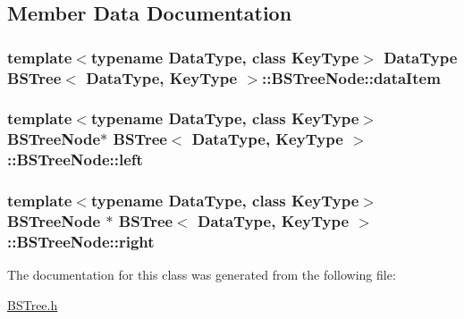 \subsection{Member Data Documentation}
\hypertarget{class_b_s_tree_1_1_b_s_tree_node_a507c8d6dde1b8d35d9af6b4e78f38962}{
\subsubsection[{data\-Item}]{\setlength{\rightskip}{0pt plus 5cm}template$<$typename Data\-Type, class Key\-Type$>$ Data\-Type {\bf B\-S\-Tree}$<$ Data\-Type, Key\-Type $>$\-::B\-S\-Tree\-Node\-::data\-Item}}\label{class_b_s_tree_1_1_b_s_tree_node_a507c8d6dde1b8d35d9af6b4e78f38962}
\hypertarget{class_b_s_tree_1_1_b_s_tree_node_a7a90150dd249432e240dc363955c5ca1}{
\subsubsection[{left}]{\setlength{\rightskip}{0pt plus 5cm}template$<$typename Data\-Type, class Key\-Type$>$ {\bf B\-S\-Tree\-Node}$\ast$ {\bf B\-S\-Tree}$<$ Data\-Type, Key\-Type $>$\-::B\-S\-Tree\-Node\-::left}}\label{class_b_s_tree_1_1_b_s_tree_node_a7a90150dd249432e240dc363955c5ca1}
\hypertarget{class_b_s_tree_1_1_b_s_tree_node_a8d7bfd0208a562c8b8ab332e1d796563}{
\subsubsection[{right}]{\setlength{\rightskip}{0pt plus 5cm}template$<$typename Data\-Type, class Key\-Type$>$ {\bf B\-S\-Tree\-Node} $\ast$ {\bf B\-S\-Tree}$<$ Data\-Type, Key\-Type $>$\-::B\-S\-Tree\-Node\-::right}}\label{class_b_s_tree_1_1_b_s_tree_node_a8d7bfd0208a562c8b8ab332e1d796563}


The documentation for this class was generated from the following file\-:\begin{DoxyCompactItemize}
\item 
\hyperlink{_b_s_tree_8h}{B\-S\-Tree.\-h}\end{DoxyCompactItemize}
